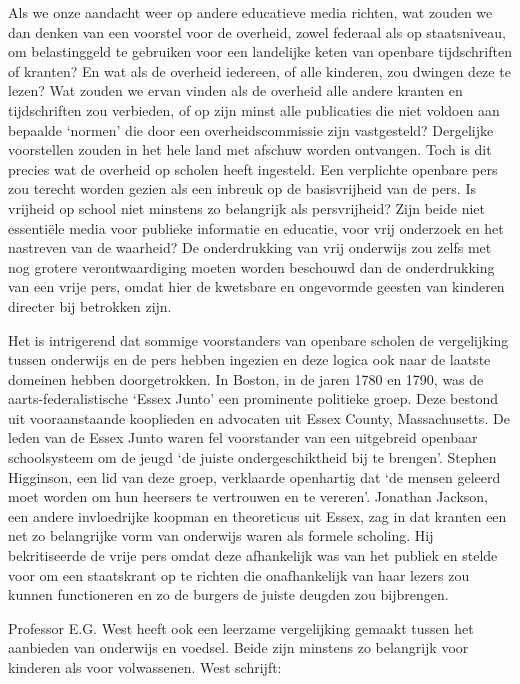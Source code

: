 \documentclass[
  a5paper,
  smalldemyvopaper,10pt,twoside,onecolumn,openright,extrafontsizes,hidelinks]{memoir}
\begin{document}
Als we onze aandacht weer op andere educatieve media richten, wat zouden
we dan denken van een voorstel voor de overheid, zowel federaal als op
staatsniveau, om belastinggeld te gebruiken voor een landelijke keten
van openbare tijdschriften of kranten? En wat als de overheid iedereen,
of alle kinderen, zou dwingen deze te lezen? Wat zouden we ervan vinden
als de overheid alle andere kranten en tijdschriften zou verbieden, of
op zijn minst alle publicaties die niet voldoen aan bepaalde `normen'
die door een overheidscommissie zijn vastgesteld? Dergelijke voorstellen
zouden in het hele land met afschuw worden ontvangen. Toch is dit
precies wat de overheid op scholen heeft ingesteld. Een verplichte
openbare pers zou terecht worden gezien als een inbreuk op de
basisvrijheid van de pers. Is vrijheid op school niet minstens zo
belangrijk als persvrijheid? Zijn beide niet essentiële media voor
publieke informatie en educatie, voor vrij onderzoek en het nastreven
van de waarheid? De onderdrukking van vrij onderwijs zou zelfs met nog
grotere verontwaardiging moeten worden beschouwd dan de onderdrukking
van een vrije pers, omdat hier de kwetsbare en ongevormde geesten van
kinderen directer bij betrokken zijn.

Het is intrigerend dat sommige voorstanders van openbare scholen de
vergelijking tussen onderwijs en de pers hebben ingezien en deze logica
ook naar de laatste domeinen hebben doorgetrokken. In Boston, in de
jaren 1780 en 1790, was de aarts-federalistische `Essex Junto' een
prominente politieke groep. Deze bestond uit vooraanstaande kooplieden
en advocaten uit Essex County, Massachusetts. De leden van de Essex
Junto waren fel voorstander van een uitgebreid openbaar schoolsysteem om
de jeugd `de juiste ondergeschiktheid bij te brengen'. Stephen
Higginson, een lid van deze groep, verklaarde openhartig dat `de mensen
geleerd moet worden om hun heersers te vertrouwen en te vereren'.
Jonathan Jackson, een andere invloedrijke koopman en theoreticus uit
Essex, zag in dat kranten een net zo belangrijke vorm van onderwijs
waren als formele scholing. Hij bekritiseerde de vrije pers omdat deze
afhankelijk was van het publiek en stelde voor om een staatskrant op te
richten die onafhankelijk van haar lezers zou kunnen functioneren en zo
de burgers de juiste deugden zou bijbrengen.

Professor E.G. West heeft ook een leerzame vergelijking gemaakt tussen
het aanbieden van onderwijs en voedsel. Beide zijn minstens zo
belangrijk voor kinderen als voor volwassenen. West schrijft:
\end{document}
